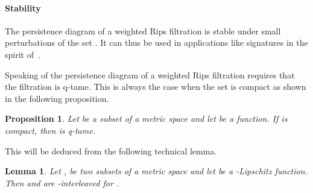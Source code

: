 \documentclass[a4paper]{article}
\newtheorem{lemma}[theorem]{Lemma}
\newtheorem{proposition}[theorem]{Proposition}
\begin{document}
\paragraph{Stability\\}
The persistence diagram of a weighted Rips filtration  is stable under small perturbations of the set . 
It can thus be used in applications like signatures in the spirit of~\cite{ghssspCCGMO}.

Speaking of the persistence diagram of a weighted Rips filtration requires that the filtration is q-tame.
This is always the case when the set  is compact as shown in the following proposition.

\begin{proposition}\label{pCompQTame}
Let  be a subset of a metric space  and let  be a function.
If  is compact, then  is q-tame.
\end{proposition}
This will be deduced from the following technical lemma.

\begin{lemma}\label{lHausInter}
Let ,  be two subsets of a metric space  and let  be a -Lipschitz function.
Then  and  are -interleaved for .
\end{lemma}
\end{document}
